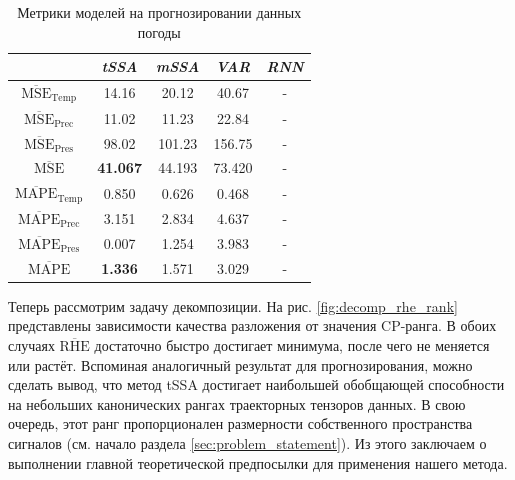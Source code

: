 	\def\arraystretch{1.1}
	\begin{table}[h]
		\centering
		\caption{Метрики моделей на прогнозировании данных погоды}\label{tab:pred_res_weather}
		\begin{tabular}{|c|c|c|c|c|}
			\hline
			& \textit{tSSA}                & \textit{mSSA} & \textit{VAR} & \textit{RNN} \\ \hline
			$ \overline{\text{MSE}}_{\text{Temp}} $  & 14.16                        & 20.12         & 40.67        & -            \\ \hline
			$ \overline{\text{MSE}}_{\text{Prec}} $  & 11.02                        & 11.23         & 22.84        & -            \\ \hline
			$ \overline{\text{MSE}}_{\text{Pres}} $  & 98.02                        & 101.23        & 156.75       & -            \\ \hline
			$ \overline{\text{MSE}} $        & \textbf{41.067}              & 44.193        & 73.420       & -            \\ \hline
			$ \overline{\text{MAPE}}_{\text{Temp}} $ & 0.850 & 0.626         & 0.468        & -            \\ \hline
			$ \overline{\text{MAPE}}_{\text{Prec}} $ & 3.151 & 2.834         & 4.637        & -            \\ \hline
			$ \overline{\text{MAPE}}_{\text{Pres}} $ & 0.007 & 1.254         & 3.983        & -            \\ \hline
			$ \overline{\text{MAPE}} $       & \textbf{1.336}               & 1.571         & 3.029        & -            \\ \hline
		\end{tabular}
	\end{table}
	
	Теперь рассмотрим задачу декомпозиции. На рис. \ref{fig:decomp_rhe_rank} представлены зависимости качества разложения от значения CP-ранга. В обоих случаях $ \overline{\text{RHE}} $ достаточно быстро достигает минимума, после чего не меняется или растёт. Вспоминая аналогичный результат для прогнозирования, можно сделать вывод, что метод tSSA достигает наибольшей обобщающей способности на небольших канонических рангах траекторных тензоров данных. В свою очередь, этот ранг пропорционален размерности собственного пространства сигналов (см. начало раздела \ref{sec:problem_statement}). Из этого заключаем о выполнении главной теоретической предпосылки для применения нашего метода.
	
